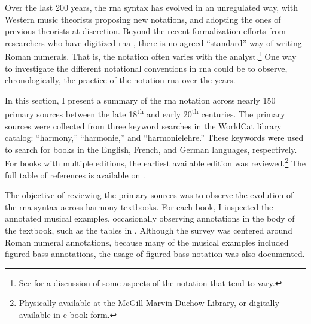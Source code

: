 

Over the last 200 years, the \gls{rna} syntax has evolved in
an unregulated way, with Western music theorists proposing
new notations, and adopting the ones of previous theorists
at discretion. Beyond the recent formalization efforts from
researchers who have digitized \gls{rna}
\parencite{huron1994humdrum, napoleslopez2017automatic,
neuwirth2018annotated, gotham2019romantext,
napoleslopez2020harmalysis, hentschel2021annotated,
hentschel2022towards}, there is no agreed ``standard'' way
of writing Roman numerals. That is, the notation often
varies with the analyst.\footnote{See
 for a
discussion of some aspects of the notation that tend to
vary.} One way to investigate the different notational
conventions in \gls{rna} could be to observe,
chronologically, the practice of the notation \gls{rna} over
the years.

In this section, I present a summary of the \gls{rna}
notation across nearly 150 primary sources between the late
18\textsuperscript{th} and early 20\textsuperscript{th}
centuries. The primary sources were collected from three
keyword searches in the
WorldCat library
catalog: ``harmony,'' ``harmonie,'' and ``harmonielehre.''
These keywords were used to search for books in the English,
French, and German languages, respectively. For books with
multiple editions, the earliest available edition was
reviewed.\footnote{Physically available at the McGill Marvin
Duchow Library, or digitally available in e-book form.} The
full table of references is available on
.


The objective of reviewing the primary sources was to
observe the evolution of the \gls{rna} syntax across harmony
textbooks. For each book, I inspected the annotated musical
examples, occasionally observing annotations in the body of
the textbook, such as the tables in
. Although
the survey was centered around Roman numeral annotations,
because many of the musical examples included figured bass
annotations, the usage of figured bass notation was also
documented. 
